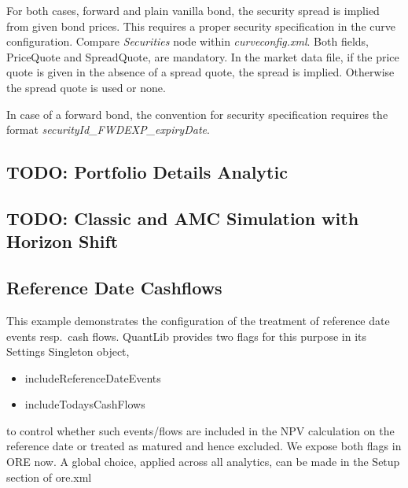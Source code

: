 For both cases, forward and plain vanilla bond, the security spread is implied from given bond prices.
This requires a proper security specification in the curve configuration. Compare \emph{Securities} node within \emph{curveconfig.xml}.
Both fields, PriceQuote and SpreadQuote, are mandatory. In the market data file, if the price quote is given in the absence of a spread quote, the spread is implied.
Otherwise the spread quote is used or none.

In case of a forward bond, the convention for security specification requires the format \emph{securityId\_FWDEXP\_expiryDate}.

\subsection{TODO: Portfolio Details Analytic}%
\label{example:74}

\subsection{TODO: Classic and AMC Simulation with Horizon Shift}%
\label{example:75}

\subsection{Reference Date Cashflows}%
\label{example:76}

This example demonstrates the configuration of the treatment of reference date events resp.~cash flows.
QuantLib provides two flags for this purpose in its Settings Singleton object,
\begin{itemize}
\item includeReferenceDateEvents
\item includeTodaysCashFlows
\end{itemize}
to control whether such events/flows are included in the NPV calculation on the reference date or treated
as matured and hence excluded. We expose both flags in ORE now. A global choice, applied across all
analytics, can be made in the Setup section of ore.xml

